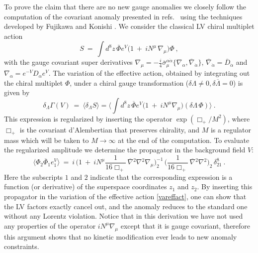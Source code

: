 \documentclass[12pt]{revtex4}
\begin{document}
To prove the claim that there are no new gauge anomalies we 
closely follow the computation of the covariant anomaly presented in 
refs.\ \cite{Hayashi:1998ca,Gates:2000gu} using the techniques
developed by Fujikawa and Konishi
\cite{Fujikawa:1983bg,Konishi:1985tu}. We consider the classical LV
chiral multiplet action  
%
\begin{equation}
S ~=~ \int d^8z\, \overline{\Phi} 
e^V \Big(1 ~+~ i N^\mu\, \nabla_\mu  \Big) \Phi~, 
\end{equation}
%
with the gauge covariant super derivatives 
$\nabla_\mu = - \frac i4 \bar\sigma^{\alpha\dot\alpha}_\mu 
\{ \nabla_\alpha, \overline{\nabla}_{\dot\alpha} \}$, 
$\overline{\nabla}_{\dot\alpha} = \overline{D}_{\dot\alpha}$ and 
$ \nabla_\alpha = e^{-V}D_\alpha e^V$. The variation of the effective
action, obtained by integrating out the chiral multiplet $\Phi$, under a
chiral gauge transformation 
($\delta \Lambda \neq 0, \delta \overline{\Lambda} = 0$)
is given by 
%
\begin{equation}
\delta_\Lambda\Gamma(V) ~=~ 
\langle \delta_\Lambda S \rangle = 
\Big\langle \int d^8z\,  \overline{\Phi} 
e^V \Big(1 ~+~ i N^\mu \nabla_\mu  \Big) (\delta \Lambda\, \Phi)
\Big\rangle~.
\label{vareffact}
\end{equation} 
%
This expression is regularized by inserting the operator 
$\exp (\Box_+/M^2)$, where $\Box_+$ is the covariant d'Alembertian that
preserves chirality, and $M$ is a regulator mass which will be taken
to $M \rightarrow \infty$ at the end of the computation. To
evaluate the regularized amplitude we determine the propagator in the
background field $V$: 
%
\begin{equation}
\langle \Phi_2 \overline{\Phi}_1 e^V_1 \rangle ~=~ 
i\,  \Big(   
1 ~+~ i N^\mu \frac 1{16 \Box_+}\,  \overline{\nabla}{}^2 \nabla{}^2
\nabla_\mu
\Big)^{-1}_2 \, 
\Big( 
\frac 1{16 \Box_+} \, \overline{\nabla}{}^2 \nabla{}^2
\Big)_2 \, \delta^8_{21}~.
\end{equation}
%
Here the subscripts $1$ and $2$ indicate that the corresponding
expression is a function (or derivative) of the superspace coordinates
$z_1$ and $z_2$. By inserting this propagator in the variation of the
effective action \eqref{vareffact}, one can show that the LV
factors exactly cancel out, and the anomaly reduces to the standard
one without any Lorentz violation. Notice that in this derivation we
have not used any properties of the operator $i N^\mu \nabla_\mu$
except that it is gauge covariant, therefore this argument 
shows that no kinetic modification ever leads to new anomaly
constraints. 
\end{document}
